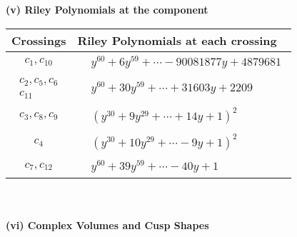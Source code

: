 \documentclass[1p]{elsarticle_modified}
\theoremstyle{definition}
\begin{document}
\newpage\renewcommand{\arraystretch}{1}
\flushleft \textbf{(v) Riley Polynomials at the component}\newline \\
\begin{tabular}{m{50pt}|m{274pt}}
Crossings & \hspace{64pt}Riley Polynomials at each crossing \\
\hline $$\begin{aligned}c_{1},c_{10}\end{aligned}$$&$\begin{aligned}
&y^{60}+6 y^{59}+\cdots-90081877 y+4879681
\end{aligned}$\\
\hline $$\begin{aligned}c_{2},c_{5},c_{6}\\c_{11}\end{aligned}$$&$\begin{aligned}
&y^{60}+30 y^{59}+\cdots+31603 y+2209
\end{aligned}$\\
\hline $$\begin{aligned}c_{3},c_{8},c_{9}\end{aligned}$$&$\begin{aligned}
&(y^{30}+9 y^{29}+\cdots+14 y+1)^{2}
\end{aligned}$\\
\hline $$\begin{aligned}c_{4}\end{aligned}$$&$\begin{aligned}
&(y^{30}+10 y^{29}+\cdots-9 y+1)^{2}
\end{aligned}$\\
\hline $$\begin{aligned}c_{7},c_{12}\end{aligned}$$&$\begin{aligned}
&y^{60}+39 y^{59}+\cdots-40 y+1
\end{aligned}$\\
\hline
\end{tabular}\\~\\
\newpage\flushleft \textbf{(vi) Complex Volumes and Cusp Shapes}
\end{document}
